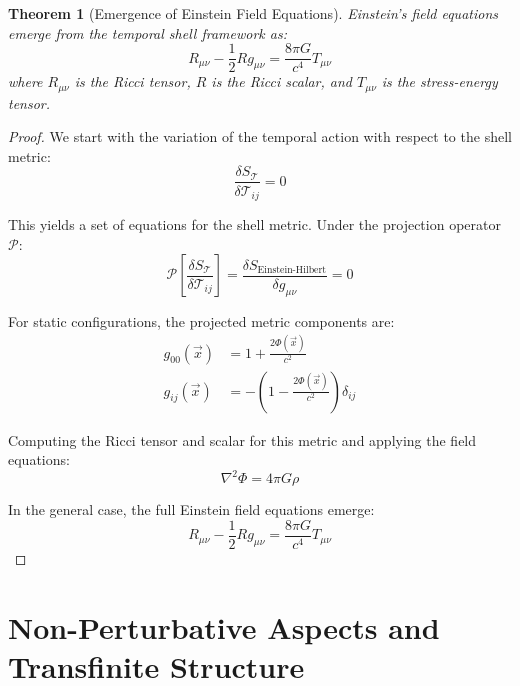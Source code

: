 \documentclass[12pt,a4paper]{article}
\newtheorem{theorem}{Theorem}[section]
\begin{document}
\begin{theorem}[Emergence of Einstein Field Equations]
\label{thm:emergence-einstein}
Einstein's field equations emerge from the temporal shell framework as:
\begin{equation}
R_{\mu\nu} - \frac{1}{2}R g_{\mu\nu} = \frac{8\pi G}{c^4} T_{\mu\nu}
\end{equation}
where $R_{\mu\nu}$ is the Ricci tensor, $R$ is the Ricci scalar, and $T_{\mu\nu}$ is the stress-energy tensor.
\end{theorem}

\begin{proof}
We start with the variation of the temporal action with respect to the shell metric:
\begin{equation}
\frac{\delta S_{\mathcal{T}}}{\delta \mathcal{T}_{ij}} = 0
\end{equation}

This yields a set of equations for the shell metric. Under the projection operator $\mathcal{P}$:
\begin{equation}
\mathcal{P}\left[\frac{\delta S_{\mathcal{T}}}{\delta \mathcal{T}_{ij}}\right] = \frac{\delta S_{\text{Einstein-Hilbert}}}{\delta g_{\mu\nu}} = 0
\end{equation}

For static configurations, the projected metric components are:
\begin{align}
g_{00}(\vec{x}) &= 1 + \frac{2\Phi(\vec{x})}{c^2} \\
g_{ij}(\vec{x}) &= -\left(1 - \frac{2\Phi(\vec{x})}{c^2}\right) \delta_{ij}
\end{align}

Computing the Ricci tensor and scalar for this metric and applying the field equations:
\begin{equation}
\nabla^2 \Phi = 4\pi G \rho
\end{equation}

In the general case, the full Einstein field equations emerge:
\begin{equation}
R_{\mu\nu} - \frac{1}{2}R g_{\mu\nu} = \frac{8\pi G}{c^4} T_{\mu\nu}
\end{equation}
\end{proof}

\section{Non-Perturbative Aspects and Transfinite Structure}
\label{sec:non-perturbative}
\end{document}
